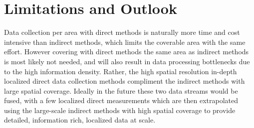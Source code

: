 \section{Limitations and Outlook} %

Data collection per area with direct methods is naturally more time and cost intensive than indirect methods, which limits the coverable area with the same effort. 
However covering with direct methods the same area as indirect methods is most likely not needed, and will also result in data processing bottlenecks due to the  high information density. Rather, the high spatial resolution in-depth localized direct data collection methods compliment the indirect methods with large spatial coverage.  Ideally in the future these two data streams would be fused, with a few localized direct measurements which are then extrapolated using the large-scale indirect methods with high spatial coverage to provide detailed, information rich, localized data at scale.


